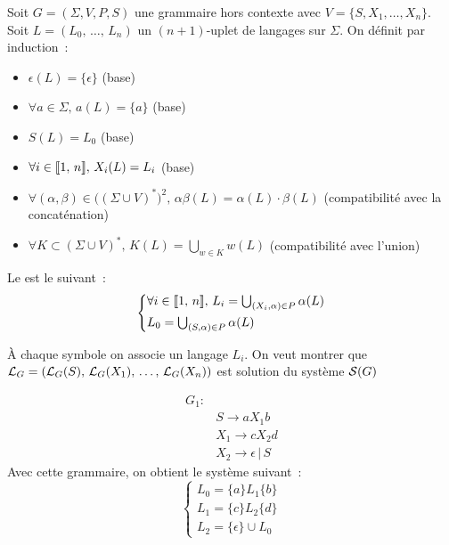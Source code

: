 \begin{adjustwidth}{-3cm}{-3cm}
\begin{definition}{}{}
    Soit $G = (\Sigma, V, P,S)$ une grammaire hors contexte avec $V = \{S, X_1, \dots, X_n\}$. Soit $L = (L_0,\, \dots,\, L_n)$ un $(n+1)$-uplet de langages sur $\Sigma$. On définit par induction~:
    \begin{itemize}
        \item $\epsilon(L) = \{\epsilon\}$ (base)
        \item $\forall a \in \Sigma,\, a(L) = \{a\}$ (base)
        \item $S(L) = L_0$ (base)
        \item $\forall i \in \llbracket 1 ,\, n \rrbracket,\, X_i(L) = L_i$ (base)
        \item $\forall (\alpha,\beta) \in \Big((\Sigma \cup V)^*\Big)^2,\, \alpha\beta(L) = \alpha(L)\cdot \beta(L)$ (compatibilité avec la concaténation)
        \item $\forall K \subset (\Sigma \cup V)^*,\, K(L) = \bigcup_{w \in K} w(L)$ (compatibilité avec l'union)
    \end{itemize}
    Le  est le suivant~:
    $$\begin{cases*}
        \forall i \in \intint{1}{n},\, L_i = \bigcup_{(X_i,\alpha) \in P}\alpha(L)\\
        L_0 = \bigcup_{(S, \alpha) \in P} \alpha(L)
    \end{cases*}$$
\end{definition}

\begin{remarque}{}{}
    À chaque symbole on associe un langage $L_i$. On veut montrer que $\mathcal{L}_G = (\mathcal{L}_{G}(S),\, \mathcal{L}_{G}(X_1),\,\dots,\,  \mathcal{L}_{G}(X_n))$ est solution du système $\mathcal{S}(G)$
\end{remarque}

\begin{exemple}{}{}
    \begin{align*}
        G_1 :&\\ 
        &S \rightarrow aX_1b\\
        &X_1 \rightarrow cX_2d\\
        &X_2 \rightarrow \epsilon \,\vert\, S
    \end{align*}
    Avec cette grammaire, on obtient le système suivant~:
    $$\begin{cases*}
        L_0 = \{a\}L_1\{b\}\\
        L_1 = \{c\}L_2\{d\}\\
        L_2 = \{\epsilon\} \cup L_0
    \end{cases*}$$
\end{exemple}


\end{adjustwidth}
